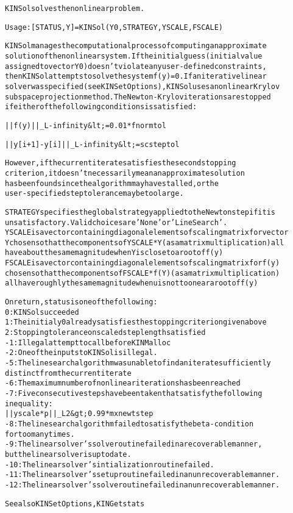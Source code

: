\begin{alltt}
KINSol solves the nonlinear problem.

   Usage:  [STATUS, Y] = KINSol(Y0, STRATEGY, YSCALE, FSCALE)

   KINSol manages the computational process of computing an approximate 
   solution of the nonlinear system. If the initial guess (initial value 
   assigned to vector Y0) doesn't violate any user-defined constraints, 
   then KINSol attempts to solve the system f(y)=0. If an iterative linear
   solver was specified (see KINSetOptions), KINSol uses a nonlinear Krylov
   subspace projection method. The Newton-Krylov iterations are stopped
   if either of the following conditions is satisfied:

       ||f(y)||_L-infinity &lt;= 0.01*fnormtol

       ||y[i+1] - y[i]||_L-infinity &lt;= scsteptol

   However, if the current iterate satisfies the second stopping
   criterion, it doesn't necessarily mean an approximate solution
   has been found since the algorithm may have stalled, or the
   user-specified step tolerance may be too large.

   STRATEGY specifies the global strategy applied to the Newton step if it is
   unsatisfactory. Valid choices are 'None' or 'LineSearch'.
   YSCALE is a vector containing diagonal elements of scaling matrix for vector 
   Y chosen so that the components of YSCALE*Y (as a matrix multiplication) all 
   have about the same magnitude when Y is close to a root of f(y)
   FSCALE is a vector containing diagonal elements of scaling matrix for f(y) 
   chosen so that the components of FSCALE*f(Y) (as a matrix multiplication) 
   all have roughly the same magnitude when u is not too near a root of f(y)

   On return, status is one of the following:
     0: KINSol succeeded
     1: The initial y0 already satisfies the stopping criterion given above
     2: Stopping tolerance on scaled step length satisfied
    -1: Illegal attempt to call before KINMalloc
    -2: One of the inputs to KINSol is illegal.
    -5: The line search algorithm was unable to find an iterate sufficiently 
        distinct from the current iterate
    -6: The maximum number of nonlinear iterations has been reached
    -7: Five consecutive steps have been taken that satisfy the following 
        inequality:
             ||yscale*p||_L2 &gt; 0.99*mxnewtstep
    -8: The line search algorithm failed to satisfy the beta-condition
        for too many times.
    -9: The linear solver's solve routine failed in a recoverable manner,
        but the linear solver is up to date.
   -10: The linear solver's intialization routine failed.
   -11: The linear solver's setup routine failed in an unrecoverable manner.
   -12: The linear solver's solve routine failed in an unrecoverable manner.

   See also KINSetOptions, KINGetstats
\end{alltt}






\vspace{0.1in}